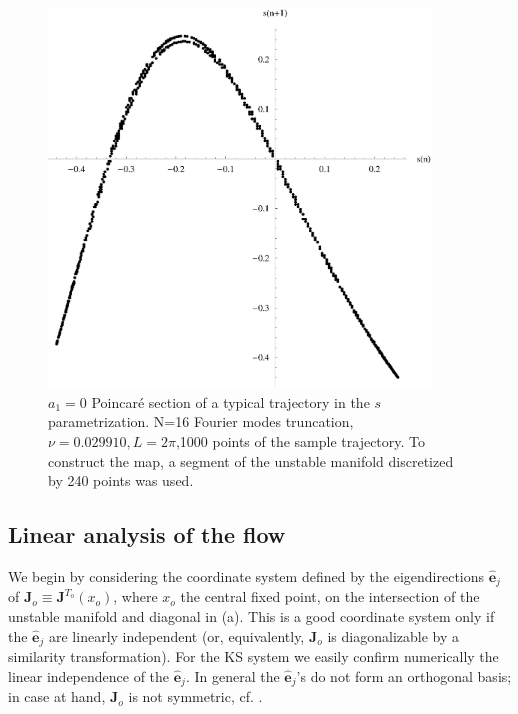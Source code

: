 \documentclass[pre,preprint,groupedaddress,showpacs,showkeys]{revtex4}
\begin{document}
  \begin{figure}[h!]
      \includegraphics[width=4in]{figs/sPoincarePlot.eps}
      \caption{ $a_1=0$ Poincar\'e section of a typical trajectory in
        the $s$ parametrization. N=16 Fourier modes truncation,
        $\nu=0.029910, L=2\pi$,1000 points of the sample trajectory.
        To construct the map, a segment of the
        unstable manifold discretized by 240 points was used.
      }
  \label{fig:sPoincare}
  \end{figure}



 \subsection{Linear analysis of the flow}


  We begin by considering the coordinate system defined by the
  eigendirections $\hat{\mathbf{e}}_j$ of $\mathbf{J}_o \equiv\mathbf{J}^{T_o}(x_o)$,
  where $x_o$ the central fixed point, on the intersection of the unstable manifold
  and diagonal in (a). This is a good
  coordinate system only
  if the $\hat{\mathbf{e}}_j$ are linearly independent (or,
  equivalently, $\mathbf{J}_o$ is diagonalizable by a similarity
  transformation).   For the KS system we easily confirm numerically the linear independence of the
  $\hat{\mathbf{e}}_j$.  %
  In general the $\hat{\mathbf{e}}_j$'s
  do not form an orthogonal basis; in case at hand, $\mathbf{J}_o$ is not
  symmetric, cf. .
\end{document}
